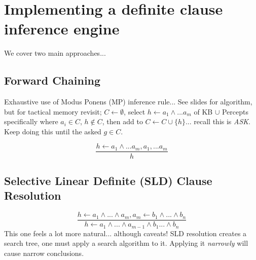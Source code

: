 \documentclass{article}
\begin{document}
\section{Implementing a definite clause inference engine}
We cover two main approaches...

\subsection{Forward Chaining}
Exhaustive use of Modus Ponens (MP) inference rule... See slides for algorithm, but for tactical memory revisit; $C \leftarrow \emptyset$, select $h \leftarrow a_1 \land ... a_m$ of KB $\cup$ Percepts specifically where $a_i \in C$, $h \not\in C$, then add to $C\leftarrow C \cup \{h\}$... recall this is \emph{ASK}. Keep doing this until the asked $g \in C$.
 
\begin{equation}
	\frac{h \leftarrow a_1 \land ... a_m, a_1,...a_m}{h}
\end{equation}

\subsection{Selective Linear Definite (SLD) Clause Resolution}
\begin{equation}
	\frac{h \leftarrow a_1 \land ...\land a_m, a_m \leftarrow b_1 \land ... \land b_n}{h \leftarrow a_1 \land ... \land a_{m-1} \land b_1 ... \land b_n}
\end{equation}
This one feels a lot more natural... although caveats! SLD resolution creates a search tree, one must apply a search algorithm to it. Applying it \emph{narrowly} will cause narrow conclusions.
\end{document}
